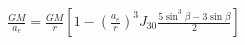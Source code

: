 \documentclass[10pt]{article}
\begin{document}
\begin{align*}\frac{G M}{a_{e}} = \frac{G M}{r} \left[ 1 - \left( \frac{a_{e}}{r} \right)^3 J_{30} \frac{ 5 \sin^3 \beta - 3 \sin \beta}{2} \right] \end{align*}
\end{document}
